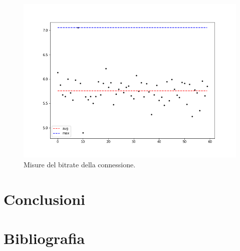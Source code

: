 \documentclass[a4paper,10pt]{article}
\begin{document}
\begin{figure}[h!]
     \centering
         \includegraphics[scale=0.4]{img/iperf.png}
         \caption{Misure del bitrate della connessione.}
         \label{fig:iperf}
\end{figure}


\section{Conclusioni}

\section{Bibliografia}
\printbibliography[heading=none]
\end{document}
